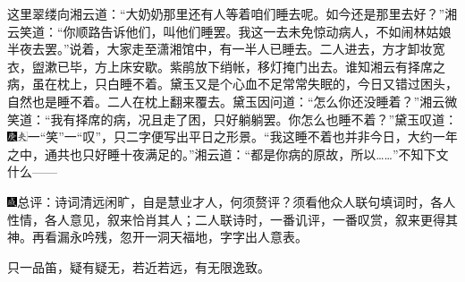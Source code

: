 这里翠缕向湘云道：“大奶奶那里还有人等着咱们睡去呢。如今还是那里去好？”湘云笑道：“你顺路告诉他们，叫他们睡罢。我这一去未免惊动病人，不如闹林姑娘半夜去罢。”说着，大家走至潇湘馆中，有一半人已睡去。二人进去，方才卸妆宽衣，盥漱已毕，方上床安歇。紫鹃放下绡帐，移灯掩门出去。谁知湘云有择席之病，虽在枕上，只白睡不着。黛玉又是个心血不足常常失眠的，今日又错过困头，自然也是睡不着。二人在枕上翻来覆去。黛玉因问道：“怎么你还没睡着？”湘云微笑道：“我有择席的病，况且走了困，只好躺躺罢。你怎么也睡不着？”黛玉叹道：{\includegraphics[width=3mm]{../Images/00004}\includegraphics[width=3mm]{../Images/00012}\footnotesize \kaishu 一“笑”一“叹”，只二字便写出平日之形景。}“我这睡不着也并非今日，大约一年之中，通共也只好睡十夜满足的。”湘云道：“都是你病的原故，所以\ldots{}\ldots{}”不知下文什么------

{\includegraphics[width=3mm]{../Images/00005}\kaishu 总评：诗词清远闲旷，自是慧业才人，何须赘评？须看他众人联句填词时，各人性情，各人意见，叙来恰肖其人；二人联诗时，一番讥评，一番叹赏，叙来更得其神。再看漏永吟残，忽开一洞天福地，字字出人意表。}

{\kaishu 只一品笛，疑有疑无，若近若远，有无限逸致。}